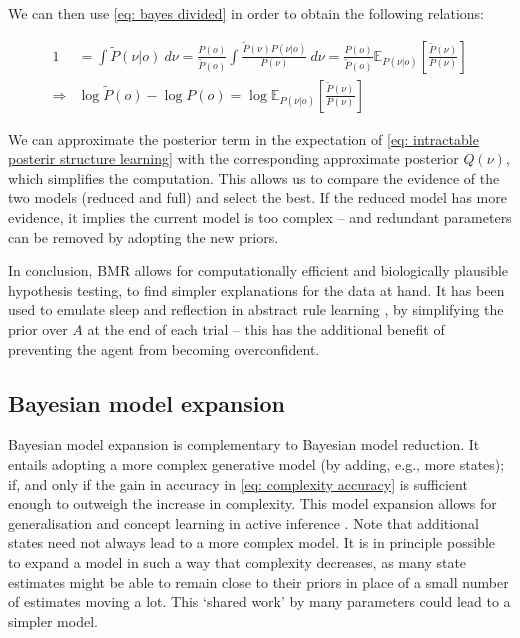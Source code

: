 \documentclass{article}
\newcommand{\E}{\mathbb E}
\begin{document}
 We can then use \eqref{eq: bayes divided} in order to obtain the following relations:
 
 \begin{align}
        1 &= \int \tilde P(\nu|o)\: d\nu =\frac{P(o)}{\tilde P(o)}\int \frac{\tilde P(\nu) P(\nu|o)}{P(\nu)} \:d\nu = \frac{P(o)}{\tilde P(o)}\E_{P(\nu|o)}\left[\frac{\tilde P(\nu)}{P(\nu)}\right] \\
        \Rightarrow &\log \tilde P(o) -\log  P(o) =\log \E_{P(\nu|o)}\left[\frac{\tilde P(\nu)}{P(\nu)}\right] \label{eq: intractable posterir structure learning}
 \end{align}

We can approximate the posterior term in the expectation of \eqref{eq: intractable posterir structure learning} with the corresponding approximate posterior $Q(\nu)$, which simplifies the computation. This allows us to compare the evidence of the two models (reduced and full) and select the best. If the reduced model has more evidence, it implies the current model is too complex – and redundant parameters can be removed by adopting the new priors.

In conclusion, BMR allows for computationally efficient and biologically plausible hypothesis testing, to find simpler explanations for the data at hand. It has been used to emulate sleep and reflection in abstract rule learning \cite{fristonActiveInferenceCuriosity2017}, by simplifying the prior over $A$ at the end of each trial -- this has the additional benefit of preventing the agent from becoming overconfident.

\subsection{Bayesian model expansion}

Bayesian model expansion is complementary to Bayesian model reduction. It entails adopting a more complex generative model (by adding, e.g., more states); if, and only if the gain in accuracy in \eqref{eq: complexity accuracy} is sufficient enough to outweigh the increase in complexity. This model expansion allows for generalisation and concept learning in active inference \cite{smithActiveInferenceModel2019}. Note that additional states need not always lead to a more complex model. It is in principle possible to expand a model in such a way that complexity decreases, as many state estimates might be able to remain close to their priors in place of a small number of estimates moving a lot. This ‘shared work’ by many parameters could lead to a simpler model.
\end{document}
